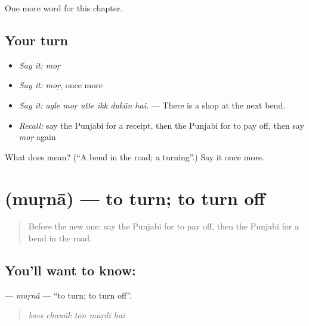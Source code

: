 \begin{grammarlens}[title={What you've built}]
One more word for this chapter.
\end{grammarlens}

\subsection*{Your turn}
\begin{itemize}
\raggedright
  \item \emph{Say it:} \emph{moṛ}
  \item \emph{Say it:} \emph{moṛ}, once more
  \item \emph{Say it:} \emph{agle moṛ utte ikk dukān hai.} — There is a shop at the next bend.
  \item \emph{Recall:} say the Punjabi for a receipt, then the Punjabi for to pay off, then say \emph{moṛ} again
\end{itemize}

\begin{tcolorbox}[breakable,colback=teal!4,colframe=teal!35!black,title={Before you move on}]
What does  mean? (\textquotedblleft{}A bend in the road; a turning\textquotedblright{}.) Say it once more.
\end{tcolorbox}
\section[\texorpdfstring{\pa{ਮੁੜਨਾ} (muṛnā)}{ਮੁੜਨਾ (muṛnā)}]{ (muṛnā) — to turn; to turn off}

\label{lesson:PA-C263-murna}



\begin{quote}
Before the new one: say the Punjabi for to pay off, then the Punjabi for a bend in the road.
\end{quote}

\subsection*{You'll want to know: }
\textbf{} — \emph{muṛnā} — \textquotedblleft{}to turn; to turn off\textquotedblright{}.

\begin{quote}
    
\end{quote}

\begin{quote}
\emph{bass chauṅk ton muṛdī hai.}
\end{quote}

